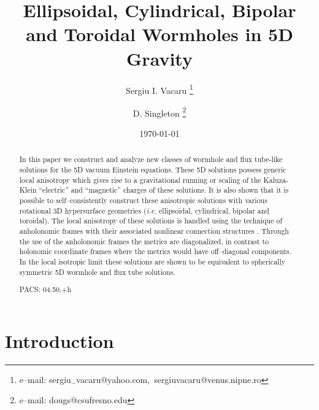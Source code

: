 \documentclass[a4paper,preprint,prabib,aps]{revtex4}
\begin{document}
\draft
\date{\today}
\title{Ellipsoidal, Cylindrical, Bipolar and Toroidal Wormholes in 5D Gravity }
\author{Sergiu I. Vacaru \thanks{
e--mail: sergiu$_{-}$vacaru@yahoo.com,\ sergiuvacaru@venus.nipne.ro}}
\address{Physics Department, CSU Fresno, Fresno, CA 93740-8031, USA\\
and \\
Centro Multidisciplinar de Astrofisica - CENTRA, Departamento de Fisica,\\
Instituto Superior Tecnico, Av. Rovisco Pais 1, Lisboa, 1049-001,\\
Portugal}
\author{D. Singleton \thanks{
e--mail: dougs@csufresno.edu}}
\address{Physics Department, CSU Fresno, Fresno, CA 93740-8031, USA}

\begin{abstract}
In this paper we construct and analyze new classes of wormhole and flux
tube-like solutions for the 5D vacuum Einstein equations. These 5D solutions
possess generic local anisotropy which gives rise to a gravitational running
or scaling of the Kaluza-Klein ``electric'' and ``magnetic'' charges of
these solutions. It is also shown that it is possible to self--consistently
construct these anisotropic solutions with various rotational 3D
hypersurface geometries ({\it i.e.} ellipsoidal, cylindrical, bipolar and
toroidal). The local anisotropy of these solutions is handled using the
technique of anholonomic frames with their associated nonlinear connection
structures \cite{vst}. Through the use of the anholonomic frames the metrics
are diagonalized, in contrast to holonomic coordinate frames where the
metrics would have off--diagonal components. In the local isotropic limit
these solutions are shown to be equivalent to spherically symmetric 5D
wormhole and flux tube solutions.

\vspace{1cm} PACS: 04.50.+h

\end{abstract}

\maketitle

\vspace{1cm}

\section{Introduction}
\end{document}
